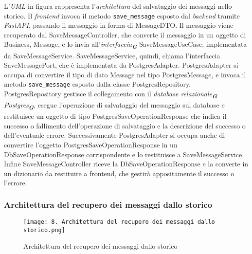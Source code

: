 L'\emph{UML} in figura rappresenta l'\emph{architettura} del salvataggio dei messaggi nello storico.
Il \emph{frontend} invoca il metodo \texttt{save\_message} esposto dal \emph{backend} tramite \emph{FastAPI}, passando il messaggio in forma di MessageDTO.
Il messaggio viene recuperato dal SaveMessageController, che converte il messaggio in un oggetto di Business, Message, e lo invia all'\emph{interfaccia}\textsubscript{\textbf{\textit{G}}} SaveMessageUseCase, implementata da SaveMessageService.
SaveMessageService, quindi, chiama l'interfaccia SaveMessagePort, che è implementata da PostgresAdapter.
PostgresAdapter si occupa di convertire il tipo di dato Message nel tipo PostgresMessage, e invoca il metodo \texttt{save\_message} esposto dalla classe PostgresRepository.
PostgresRepository gestisce il collegamento con il \emph{database relazionale}\textsubscript{\textbf{\textit{G}}} \emph{Postgres}\textsubscript{\textbf{\textit{G}}},
esegue l'operazione di salvataggio del messaggio sul database e restituisce un oggetto di tipo PostgresSaveOperationResponse che indica il successo o fallimento dell'operazione di salvataggio e la descrizione del successo o dell'eventuale errore.
Successivamente PostgresAdapter si occupa anche di convertire l'oggetto PostgresSaveOperationResponse in un DbSaveOperationResponse corrispondente e lo restituisce a SaveMessageService.
Infine SaveMessageController riceve la DbSaveOperationResponse e la converte in un dizionario da restituire a frontend, che gestirà appositamente il successo o l'errore.

\newpage


\subsubsection{Architettura del recupero dei messaggi dallo storico}
\label{sec:architettura_recupero_messaggi_storico}

\begin{figure}[h]
    \centering
    \texttt{[image: 8. Architettura del recupero dei messaggi dallo storico.png]}
    \caption{Architettura del recupero dei messaggi dallo storico}
\end{figure}

